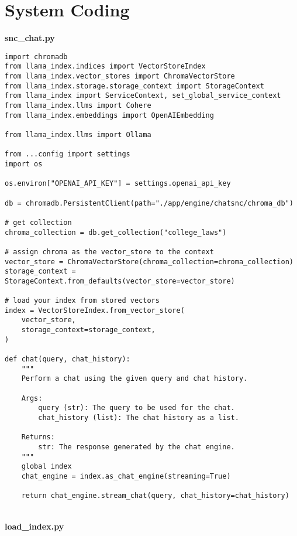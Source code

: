 


\chapter{System Coding}


  
\textbf{snc\_chat.py}

\begin{Verbatim}[breaklines=true, breakanywhere=true]
import chromadb
from llama_index.indices import VectorStoreIndex
from llama_index.vector_stores import ChromaVectorStore
from llama_index.storage.storage_context import StorageContext
from llama_index import ServiceContext, set_global_service_context
from llama_index.llms import Cohere
from llama_index.embeddings import OpenAIEmbedding

from llama_index.llms import Ollama

from ...config import settings
import os

os.environ["OPENAI_API_KEY"] = settings.openai_api_key

db = chromadb.PersistentClient(path="./app/engine/chatsnc/chroma_db")

# get collection
chroma_collection = db.get_collection("college_laws")

# assign chroma as the vector_store to the context
vector_store = ChromaVectorStore(chroma_collection=chroma_collection)
storage_context = StorageContext.from_defaults(vector_store=vector_store)

# load your index from stored vectors
index = VectorStoreIndex.from_vector_store(
    vector_store,
    storage_context=storage_context,
)

def chat(query, chat_history):
    """
    Perform a chat using the given query and chat history.

    Args:
        query (str): The query to be used for the chat.
        chat_history (list): The chat history as a list.

    Returns:
        str: The response generated by the chat engine.
    """
    global index
    chat_engine = index.as_chat_engine(streaming=True)

    return chat_engine.stream_chat(query, chat_history=chat_history)  
\end{Verbatim}
\
\\
\textbf{load\_index.py}

